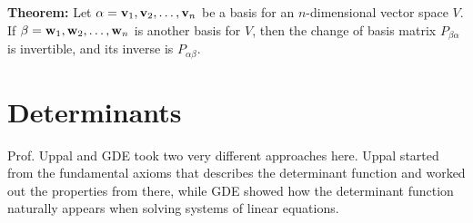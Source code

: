 \documentclass{article}
\begin{document}
\begin{minipage}[t]{.45\textwidth}
        \textbf{Theorem:} Let $\alpha=\mathbf{v}_1,\mathbf{v}_2,\dots, \mathbf{v}_n$ be a basis for an $n$-dimensional vector space $V$. If $\beta=\mathbf{w}_1,\mathbf{w}_2,\dots,\mathbf{w}_n$ is another basis for $V$, then the change of basis matrix $P_{\beta\alpha}$ is invertible, and its inverse is $P_{\alpha\beta}$.
    \end{minipage}
    \newpage
    \section{Determinants}
    Prof. Uppal and GDE took two very different approaches here. Uppal started from the fundamental axioms that describes the determinant function and worked out the properties from there, while GDE showed how the determinant function naturally appears when solving systems of linear equations.
    \vspace{2mm}
\end{document}
